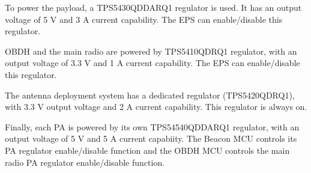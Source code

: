 To power the payload, a TPS5430QDDARQ1 regulator is used. It has an output voltage of 5 V and 3 A current capability. The EPS can enable/disable this regulator.

OBDH and the main radio are powered by TPS5410QDRQ1 regulator, with an output voltage of 3.3 V and 1 A current capability. The EPS can enable/disable this regulator.

The antenna deployment system has a dedicated regulator (TPS5420QDRQ1), with 3.3 V output voltage and 2 A current capability. This regulator is always on.

Finally, each PA is powered by its own TPS54540QDDARQ1 regulator, with an output voltage of 5 V and 5 A current capabiity. The Beacon MCU controls its PA regulator enable/disable function and the OBDH MCU controls the main radio PA regulator enable/disable function.
